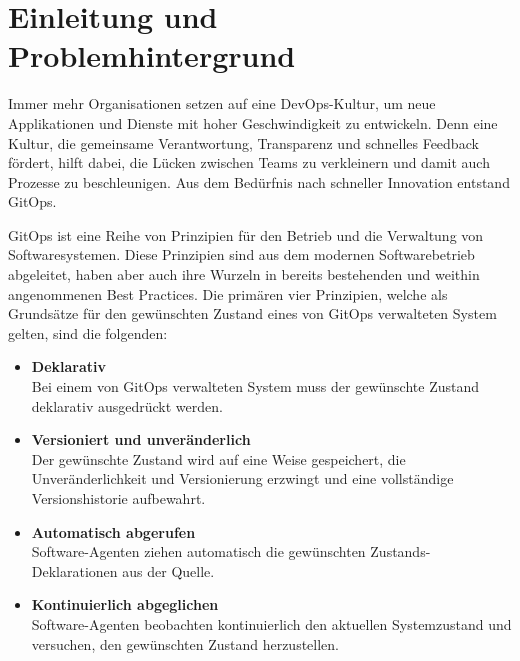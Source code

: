 \chapter{Einleitung und Problemhintergrund}


Immer mehr Organisationen setzen auf 
eine DevOps-Kultur, um neue Applikationen und Dienste mit hoher Geschwindigkeit zu entwickeln. 
Denn eine Kultur, die gemeinsame Verantwortung, Transparenz und schnelles Feedback fördert, 
hilft dabei, die Lücken zwischen Teams zu verkleinern und damit auch Prozesse zu beschleunigen.
Aus dem Bedürfnis nach schneller Innovation entstand GitOps.
\bigskip


\noindent
GitOps ist eine Reihe von Prinzipien für den Betrieb und die Verwaltung von Softwaresystemen.
Diese Prinzipien sind aus dem modernen Softwarebetrieb abgeleitet, haben aber auch ihre Wurzeln 
in bereits bestehenden und weithin angenommenen Best Practices. Die primären vier Prinzipien,
welche als Grundsätze für den gewünschten Zustand eines
von GitOps verwalteten System gelten, sind die folgenden:

\begin{itemize}
	\item \textbf{Deklarativ} \\
		Bei einem von GitOps verwalteten System muss der gewünschte Zustand deklarativ ausgedrückt werden.
	\item \textbf{Versioniert und unveränderlich} \\
		Der gewünschte Zustand wird auf eine Weise gespeichert, die Unveränderlichkeit und Versionierung erzwingt und eine vollständige Versionshistorie aufbewahrt.
	\item \textbf{Automatisch abgerufen} \\
		Software-Agenten ziehen automatisch die gewünschten Zustands-Deklarationen aus der Quelle.
	\item \textbf{Kontinuierlich abgeglichen} \\
		Software-Agenten beobachten kontinuierlich den aktuellen Systemzustand und versuchen, den gewünschten Zustand herzustellen.
\end{itemize}

\autocite{gitopsPrinciplesv100}
\bigskip

